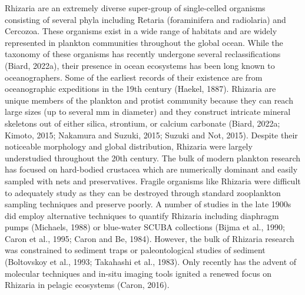 \documentclass[
]{article}
\begin{document}
Rhizaria are an extremely diverse super-group of single-celled organisms
consisting of several phyla including Retaria (foraminifera and
radiolaria) and Cercozoa. These organisms exist in a wide range of
habitats and are widely represented in plankton communities throughout
the global ocean. While the taxonomy of these organisms has recently
undergone several reclassifications (Biard, 2022a), their presence in
ocean ecosystems has been long known to oceanographers. Some of the
earliest records of their existence are from oceanographic expeditions
in the 19th century (Haekel, 1887). Rhizaria are unique members of the
plankton and protist community because they can reach large sizes (up to
several mm in diameter) and they construct intricate mineral skeletons
out of either silica, strontium, or calcium carbonate (Biard, 2022a;
Kimoto, 2015; Nakamura and Suzuki, 2015; Suzuki and Not, 2015). Despite
their noticeable morphology and global distribution, Rhizaria were
largely understudied throughout the 20th century. The bulk of modern
plankton research has focused on hard-bodied crustacea which are
numerically dominant and easily sampled with nets and preservatives.
Fragile organisms like Rhizaria were difficult to adequately study as
they can be destroyed through standard zooplankton sampling techniques
and preserve poorly. A number of studies in the late 1900s did employ
alternative techniques to quantify Rhizaria including diaphragm pumps
(Michaels, 1988) or blue-water SCUBA collections (Bijma et al., 1990;
Caron et al., 1995; Caron and Be, 1984). However, the bulk of Rhizaria
research was constrained to sediment traps or paleontological studies of
sediment (Boltovskoy et al., 1993; Takahashi et al., 1983). Only
recently has the advent of molecular techniques and in-situ imaging
tools ignited a renewed focus on Rhizaria in pelagic ecosystems (Caron,
2016).
\end{document}

